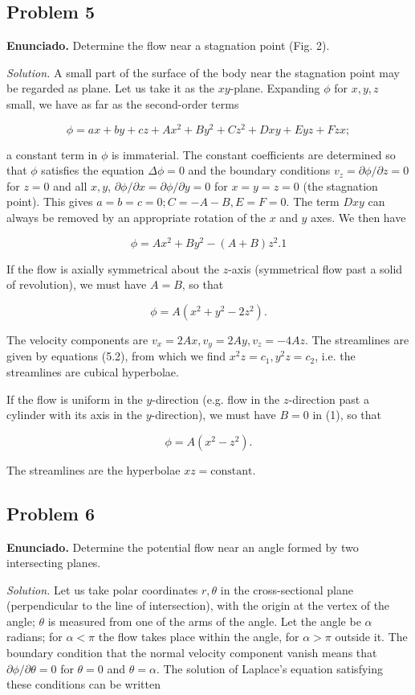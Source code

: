 \documentclass{article}
\begin{document}
\subsection*{Problem 5}

\textbf{Enunciado.} Determine the flow near a stagnation point (Fig. 2).

\textit{Solution.} A small part of the surface of the body near the stagnation point may be regarded as plane. Let us take it as the $xy$-plane. Expanding $\phi$ for $x, y, z$ small, we have as far as the second-order terms

$$
\phi = ax + by + cz + Ax^2 + By^2 + Cz^2 + Dxy + Eyz + Fzx;
$$

a constant term in $\phi$ is immaterial. The constant coefficients are determined so that $\phi$ satisfies the equation $\Delta \phi = 0$ and the boundary conditions $v_z = \partial \phi/\partial z = 0$ for $z = 0$ and all $x, y$, $\partial \phi/\partial x = \partial \phi/\partial y = 0$ for $x = y = z = 0$ (the stagnation point). This gives $a = b = c = 0; C = -A - B, E = F = 0$. The term $Dxy$ can always be removed by an appropriate rotation of the $x$ and $y$ axes. We then have

$$
\phi = Ax^2 + By^2 - (A + B)z^2. {1}
$$

If the flow is axially symmetrical about the $z$-axis (symmetrical flow past a solid of revolution), we must have $A = B$, so that

$$
\phi = A(x^2 + y^2 - 2z^2).
$$

The velocity components are $v_x = 2Ax, v_y = 2Ay, v_z = -4Az$. The streamlines are given by equations (5.2), from which we find $x^2z = c_1, y^2z = c_2$, i.e. the streamlines are cubical hyperbolae.

If the flow is uniform in the $y$-direction (e.g. flow in the $z$-direction past a cylinder with its axis in the $y$-direction), we must have $B = 0$ in (1), so that

$$
\phi = A(x^2 - z^2).
$$

The streamlines are the hyperbolae $xz = \text{constant}$.

\subsection*{Problem 6}

\textbf{Enunciado.} Determine the potential flow near an angle formed by two intersecting planes.

\textit{Solution.} Let us take polar coordinates $r, \theta$ in the cross-sectional plane (perpendicular to the line of intersection), with the origin at the vertex of the angle; $\theta$ is measured from one of the arms of the angle. Let the angle be $\alpha$ radians; for $\alpha < \pi$ the flow takes place within the angle, for $\alpha > \pi$ outside it. The boundary condition that the normal velocity component vanish means that $\partial \phi/\partial \theta = 0$ for $\theta = 0$ and $\theta = \alpha$. The solution of Laplace's equation satisfying these conditions can be written
\end{document}
